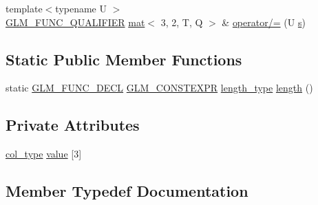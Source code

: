 \begin{DoxyCompactItemize}
\item 
{\footnotesize template$<$typename U $>$ }\\\mbox{\hyperlink{setup_8hpp_a33fdea6f91c5f834105f7415e2a64407}{G\+L\+M\+\_\+\+F\+U\+N\+C\+\_\+\+Q\+U\+A\+L\+I\+F\+I\+ER}} \mbox{\hyperlink{structglm_1_1mat}{mat}}$<$ 3, 2, T, Q $>$ \& \mbox{\hyperlink{structglm_1_1mat_3_013_00_012_00_01_t_00_01_q_01_4_a153c18b6262094cf8741f0e82173b2a4}{operator/=}} (U \mbox{\hyperlink{_s_d_l__opengl_8h_a4af680a6c683f88ed67b76f207f2e6e4}{s}})
\end{DoxyCompactItemize}
\subsection*{Static Public Member Functions}
\begin{DoxyCompactItemize}
\item 
static \mbox{\hyperlink{setup_8hpp_ab2d052de21a70539923e9bcbf6e83a51}{G\+L\+M\+\_\+\+F\+U\+N\+C\+\_\+\+D\+E\+CL}} \mbox{\hyperlink{setup_8hpp_a08b807947b47031d3a511f03f89645ad}{G\+L\+M\+\_\+\+C\+O\+N\+S\+T\+E\+X\+PR}} \mbox{\hyperlink{structglm_1_1mat_3_013_00_012_00_01_t_00_01_q_01_4_ac2f268fa5e899b2a6ad8139183ed61d4}{length\+\_\+type}} \mbox{\hyperlink{structglm_1_1mat_3_013_00_012_00_01_t_00_01_q_01_4_a0749f456a66fa818e3d8aa4db3eaea3b}{length}} ()
\end{DoxyCompactItemize}
\subsection*{Private Attributes}
\begin{DoxyCompactItemize}
\item 
\mbox{\hyperlink{structglm_1_1mat_3_013_00_012_00_01_t_00_01_q_01_4_aa610dcaaae528e1eea8bdaaa435ad3a4}{col\+\_\+type}} \mbox{\hyperlink{structglm_1_1mat_3_013_00_012_00_01_t_00_01_q_01_4_a49358f69d92f2817e5ee764a5ae2cc8f}{value}} \mbox{[}3\mbox{]}
\end{DoxyCompactItemize}


\subsection{Member Typedef Documentation}
\mbox{\label{structglm_1_1mat_3_013_00_012_00_01_t_00_01_q_01_4_aa610dcaaae528e1eea8bdaaa435ad3a4}} 
